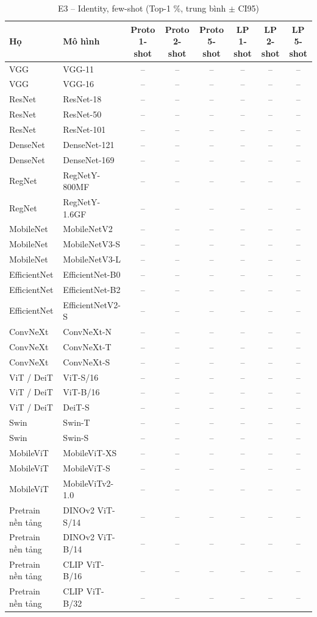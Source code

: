 \begin{table}[t]
\centering
\small
\caption{E3 – Identity, few-shot (Top-1 \%, trung bình $\pm$ CI95)}
\begin{tabular}{llcccccc}
\toprule
Họ & Mô hình & Proto 1-shot & Proto 2-shot & Proto 5-shot & LP 1-shot & LP 2-shot & LP 5-shot \\
\midrule
VGG & VGG-11 & – & – & – & – & – & – \\
VGG & VGG-16 & – & – & – & – & – & – \\
ResNet & ResNet-18 & – & – & – & – & – & – \\
ResNet & ResNet-50 & – & – & – & – & – & – \\
ResNet & ResNet-101 & – & – & – & – & – & – \\
DenseNet & DenseNet-121 & – & – & – & – & – & – \\
DenseNet & DenseNet-169 & – & – & – & – & – & – \\
RegNet & RegNetY-800MF & – & – & – & – & – & – \\
RegNet & RegNetY-1.6GF & – & – & – & – & – & – \\
MobileNet & MobileNetV2 & – & – & – & – & – & – \\
MobileNet & MobileNetV3-S & – & – & – & – & – & – \\
MobileNet & MobileNetV3-L & – & – & – & – & – & – \\
EfficientNet & EfficientNet-B0 & – & – & – & – & – & – \\
EfficientNet & EfficientNet-B2 & – & – & – & – & – & – \\
EfficientNet & EfficientNetV2-S & – & – & – & – & – & – \\
ConvNeXt & ConvNeXt-N & – & – & – & – & – & – \\
ConvNeXt & ConvNeXt-T & – & – & – & – & – & – \\
ConvNeXt & ConvNeXt-S & – & – & – & – & – & – \\
ViT / DeiT & ViT-S/16 & – & – & – & – & – & – \\
ViT / DeiT & ViT-B/16 & – & – & – & – & – & – \\
ViT / DeiT & DeiT-S & – & – & – & – & – & – \\
Swin & Swin-T & – & – & – & – & – & – \\
Swin & Swin-S & – & – & – & – & – & – \\
MobileViT & MobileViT-XS & – & – & – & – & – & – \\
MobileViT & MobileViT-S & – & – & – & – & – & – \\
MobileViT & MobileViTv2-1.0 & – & – & – & – & – & – \\
Pretrain nền tảng & DINOv2 ViT-S/14 & – & – & – & – & – & – \\
Pretrain nền tảng & DINOv2 ViT-B/14 & – & – & – & – & – & – \\
Pretrain nền tảng & CLIP ViT-B/16 & – & – & – & – & – & – \\
Pretrain nền tảng & CLIP ViT-B/32 & – & – & – & – & – & – \\
\bottomrule
\end{tabular}
\end{table}
